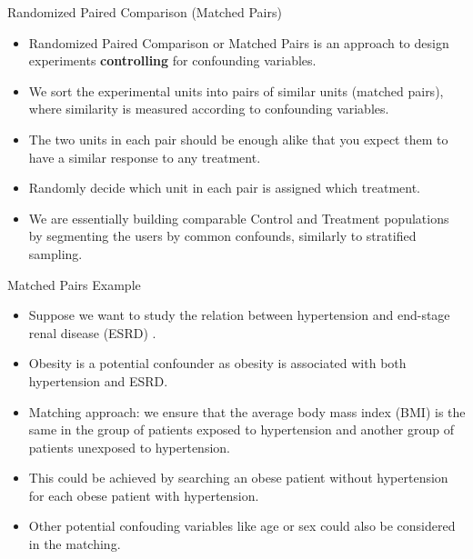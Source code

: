 \documentclass[handout]{beamer}
\begin{document}
\begin{frame}{Randomized Paired Comparison (Matched Pairs)}
\scriptsize{

\begin{itemize}

\item Randomized Paired Comparison or Matched Pairs is an approach to design experiments \textbf{controlling} for confounding variables. 

\item We sort the experimental units into pairs of similar units (matched pairs), where similarity is measured according to confounding variables.

\item  The two units in each pair should be enough alike that you expect them to have a similar response to any treatment.

\item Randomly decide which unit in each pair is assigned which treatment.

\item We are essentially building comparable Control and Treatment populations by segmenting the users by common confounds, similarly to stratified sampling.
  
\end{itemize}



} 
\end{frame}


\begin{frame}{Matched Pairs Example}
\scriptsize{

\begin{itemize}

\item Suppose we want to study the relation between hypertension and end-stage renal disease (ESRD) \cite{de2011matching}.

\item Obesity is a potential confounder as obesity is associated with both hypertension and ESRD. 

\item Matching approach: we ensure that the average body mass index (BMI) is the same in the group of patients exposed to hypertension and another group of patients unexposed to hypertension. 

\item This could be achieved by searching an obese patient without hypertension for each obese patient with hypertension.
  
\item Other potential confouding variables like age or sex could also be considered in the matching.  
  
\end{itemize}



} 
\end{frame}
\end{document}
